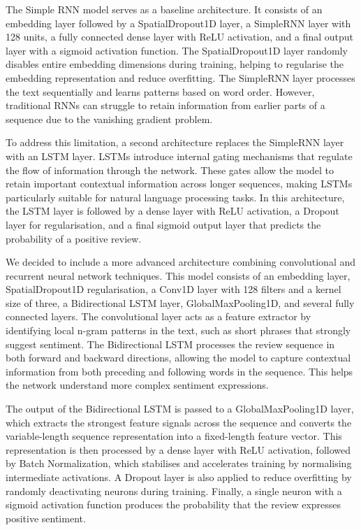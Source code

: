 \documentclass[12pt,a4paper]{article}
\begin{document}
The Simple RNN model serves as a baseline architecture. It consists of an embedding layer followed by a SpatialDropout1D layer, a SimpleRNN layer with 128 units, a fully connected dense layer with ReLU activation, and a final output layer with a sigmoid activation function. The SpatialDropout1D layer randomly disables entire embedding dimensions during training, helping to regularise the embedding representation and reduce overfitting. The SimpleRNN layer processes the text sequentially and learns patterns based on word order. However, traditional RNNs can struggle to retain information from earlier parts of a sequence due to the vanishing gradient problem.

To address this limitation, a second architecture replaces the SimpleRNN layer with an LSTM layer. LSTMs introduce internal gating mechanisms that regulate the flow of information through the network. These gates allow the model to retain important contextual information across longer sequences, making LSTMs particularly suitable for natural language processing tasks. In this architecture, the LSTM layer is followed by a dense layer with ReLU activation, a Dropout layer for regularisation, and a final sigmoid output layer that predicts the probability of a positive review.

We decided to include a more advanced architecture combining convolutional and recurrent neural network techniques. This model consists of an embedding layer, SpatialDropout1D regularisation, a Conv1D layer with 128 filters and a kernel size of three, a Bidirectional LSTM layer, GlobalMaxPooling1D, and several fully connected layers. The convolutional layer acts as a feature extractor by identifying local n-gram patterns in the text, such as short phrases that strongly suggest sentiment. The Bidirectional LSTM processes the review sequence in both forward and backward directions, allowing the model to capture contextual information from both preceding and following words in the sequence. This helps the network understand more complex sentiment expressions.

The output of the Bidirectional LSTM is passed to a GlobalMaxPooling1D layer, which extracts the strongest feature signals across the sequence and converts the variable-length sequence representation into a fixed-length feature vector. This representation is then processed by a dense layer with ReLU activation, followed by Batch Normalization, which stabilises and accelerates training by normalising intermediate activations. A Dropout layer is also applied to reduce overfitting by randomly deactivating neurons during training. Finally, a single neuron with a sigmoid activation function produces the probability that the review expresses positive sentiment.
\end{document}
